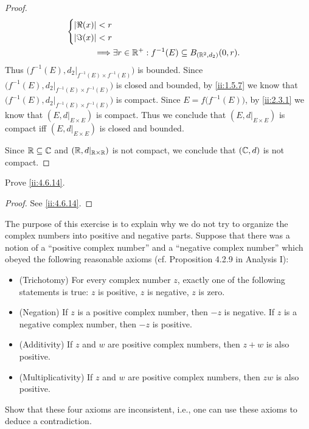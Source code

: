 \begin{proof}
\begin{align*}
\begin{dcases}
                                                       \left\lvert\Re(x)\right\rvert < r \\
                                                       \left\lvert\Im(x)\right\rvert < r
                                                     \end{dcases}                                                       \\
    \implies & \exists r \in \mathbb{R}^+ : f^{-1}(E) \subseteq B_{(\mathbb{R}^2, d_2)}(0, r).
  \end{align*}
  Thus \(\big(f^{-1}(E), d_2|_{f^{-1}(E) \times f^{-1}(E)}\big)\) is bounded.
  Since \(\big(f^{-1}(E), d_2|_{f^{-1}(E) \times f^{-1}(E)}\big)\) is closed and bounded, by \cref{ii:1.5.7} we know that \(\big(f^{-1}(E), d_2|_{f^{-1}(E) \times f^{-1}(E)}\big)\) is compact.
  Since \(E = f\big(f^{-1}(E)\big)\), by \cref{ii:2.3.1} we know that \((E, d|_{E \times E})\) is compact.
  Thus we conclude that \((E, d|_{E \times E})\) is compact iff \((E, d|_{E \times E})\) is closed and bounded.

  Since \(\mathbb{R} \subseteq \mathbb{C}\) and \((\mathbb{R}, d|_{\mathbb{R} \times \mathbb{R}})\) is not compact, we conclude that \((\mathbb{C}, d)\) is not compact.
\end{proof}

\begin{ex}\label{ii:ex:4.6.14}
  Prove \cref{ii:4.6.14}.
\end{ex}

\begin{proof}
  See \cref{ii:4.6.14}.
\end{proof}

\begin{ex}\label{ii:ex:4.6.15}
  The purpose of this exercise is to explain why we do not try to organize the complex numbers into positive and negative parts.
  Suppose that there was a notion of a ``positive complex number'' and a ``negative complex number'' which obeyed the following reasonable axioms (cf. Proposition 4.2.9 in Analysis I):
  \begin{itemize}
    \item (Trichotomy)
          For every complex number \(z\), exactly one of the following statements is true:
          \(z\) is positive, \(z\) is negative, \(z\) is zero.
    \item (Negation)
          If \(z\) is a positive complex number, then \(-z\) is negative.
          If \(z\) is a negative complex number, then \(-z\) is positive.
    \item (Additivity)
          If \(z\) and \(w\) are positive complex numbers, then \(z + w\) is also positive.
    \item (Multiplicativity)
          If \(z\) and \(w\) are positive complex numbers, then \(zw\) is also positive.
  \end{itemize}
  Show that these four axioms are inconsistent, i.e., one can use these axioms to deduce a contradiction.
\end{ex}

